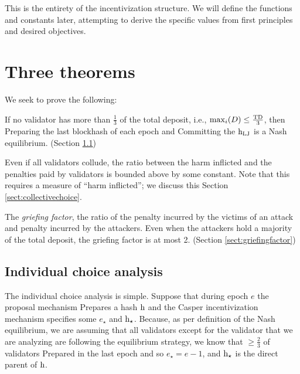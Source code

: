 \documentclass[12pt, final]{article}
\newcommand{\epoch}{\ensuremath{e}\xspace}
\newcommand{\hash}{\textnormal{h}\xspace}
\newcommand{\hashsource}{\ensuremath{\hash_{\star}}\xspace}
\newcommand{\epochsource}{\ensuremath{\epoch_{\star}}\xspace}
\newcommand{\totaldeposit}{\textnormal{TD}\xspace}
\newcommand{\hashLJ}{\ensuremath{\hash_{\textnormal{LJ}}}\xspace} %
\begin{document}
This is the entirety of the incentivization structure.  We will define the functions and constants later, attempting to derive the specific values from first principles and desired objectives.

\section{Three theorems}

We seek to prove the following:

\begin{theorem}
\label{theorem1}
If no validator has more than $\frac{1}{3}$ of the total deposit, i.e., $\max_i(D) \leq \frac{\totaldeposit}{3}$, then Preparing the last blockhash of each epoch and Committing the $\hashLJ$ is a Nash equilibrium. (Section \ref{sect:indivchoice})
\end{theorem}

\begin{theorem}
\label{theorem2}
Even if all validators collude, the ratio between the harm inflicted and the penalties paid by validators is bounded above by some constant. Note that this requires a measure of ``harm inflicted''; we discuss this Section \ref{sect:collectivechoice}.
\end{theorem}

\begin{theorem}
\label{theorem3}
The \emph{griefing factor}, the ratio of the penalty incurred by the victims of an attack and penalty incurred by the attackers. Even when the attackers hold a majority of the total deposit, the griefing factor is at most 2. (Section \ref{sect:griefingfactor})
\end{theorem}

\subsection{Individual choice analysis}
\label{sect:indivchoice}

The individual choice analysis is simple. Suppose that during epoch $\epoch$ the proposal mechanism Prepares a hash $\hash$ and the Casper incentivization mechanism specifies some $\epochsource$ and $\hashsource$. Because, as per definition of the Nash equilibrium, we are assuming that all validators except for the validator that we are analyzing are following the equilibrium strategy, we know that $\ge \frac{2}{3}$ of validators Prepared in the last epoch and so $\epochsource = \epoch - 1$, and $\hashsource$ is the direct parent of $\hash$.
\end{document}
